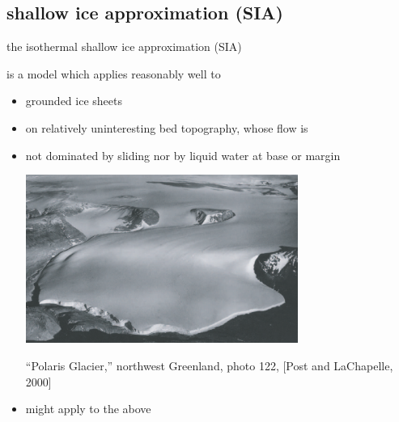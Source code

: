 \subsection{shallow ice approximation (SIA)}

\begin{frame}{the isothermal shallow ice approximation (SIA)}

is a model which applies reasonably well to
\begin{itemize}
\item grounded ice sheets
\item on relatively uninteresting bed topography, whose flow is
\item not dominated by sliding nor by liquid water at base or margin
\begin{center}
  \includegraphics[width=0.7\textwidth]{photos/polaris}

\tiny ``Polaris Glacier,'' northwest Greenland, photo 122, [Post and LaChapelle, 2000]\nocite{PostLaChapelle}
\end{center}
\item might apply to the above
\end{itemize}
\end{frame}


